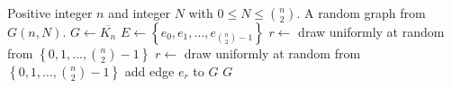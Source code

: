 
\begin{algorithmic}[1]
\Require Positive integer $n$ and integer $N$ with 
  $0 \leq N \leq \binom{n}{2}$.
\Ensure A random graph from $G(n,N)$.
\State $G \gets \overline{K_n}$
\State $E \gets \left\{e_0, e_1, \dots, e_{\binom{n}{2} - 1}\right\}$
  \State $r \gets$ draw uniformly at random from $\left\{0, 1, \dots, \binom{n}{2} - 1\right\}$
    \State $r \gets$ draw uniformly at random from $\left\{0, 1, \dots, \binom{n}{2} - 1\right\}$
  \EndWhile
  \State add edge $e_r$ to $G$
\EndFor
\State \Return $G$
\end{algorithmic}
